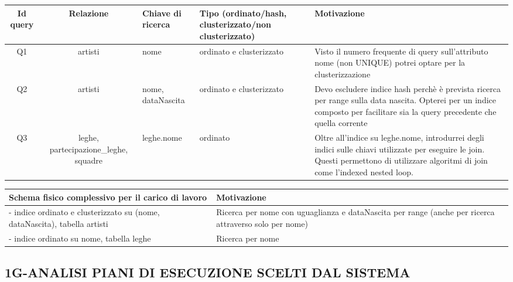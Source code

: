 \documentclass[a4paper]{article}
\begin{document}
\begin{center}
\begin{footnotesize}
\begin{tabular}{|c|c|p{2cm}|p{2cm}|p{5cm}|}
\hline
{\bf Id query} & {\bf Relazione} & \parbox{2cm}{\bf Chiave di ricerca} & \parbox{2cm}{\bf Tipo (ordinato/hash, clusterizzato/non clusterizzato)} & \parbox{5cm}{\bf Motivazione} \\
\hline
Q1 & artisti & nome & ordinato e clusterizzato &  Visto il numero frequente di query sull'attributo nome (non UNIQUE) potrei optare per la clusterizzazione\\
Q2 & artisti & nome, dataNascita & ordinato e clusterizzato & Devo escludere indice hash perchè è prevista ricerca per range sulla data nascita. Opterei per un indice composto per facilitare sia la query precedente che quella corrente\\
Q3 & leghe, partecipazione\_leghe, squadre & leghe.nome & ordinato & Oltre all'indice su leghe.nome, introdurrei degli indici sulle chiavi utilizzate per eseguire le join. Questi permettono di utilizzare algoritmi di join come l'indexed nested loop.\\
\hline
\end{tabular}
\end{footnotesize}
\end{center}



\begin{center}
\begin{footnotesize}
\begin{tabular}{|p{6.5cm}|p{6.5cm}|}
\hline
\parbox{5cm}{\bf Schema fisico complessivo per il carico di lavoro} &  \parbox{5cm}{\bf Motivazione} \\
\hline
- indice ordinato e clusterizzato su (nome, dataNascita), tabella artisti& Ricerca per nome con uguaglianza e dataNascita per range (anche per ricerca attraverso solo per nome) \\
- indice ordinato su nome, tabella leghe& Ricerca per nome\\
\hline
\end{tabular}
\end{footnotesize}
\end{center}

\subsection{1G-ANALISI PIANI DI ESECUZIONE SCELTI DAL SISTEMA\\}
\end{document}
